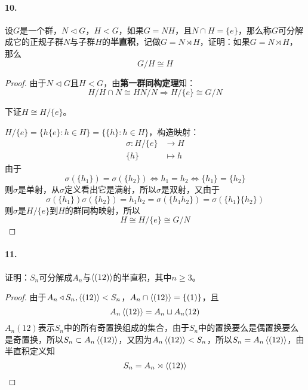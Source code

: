 \documentclass[12pt, a4paper, oneside]{ctexart}
\begin{document}
\paragraph{10.}设$G$是一个群，$N\triangleleft G$，$H < G$，如果$G=NH$，且$N\cap H=\{e\}$，那么称$G$可分解成它的正规子群$N$与子群$H$的\textbf{半直积}，记做$G=N\rtimes H$，证明：如果$G=N\rtimes H$，那么
\begin{equation*}
    G/H\cong H
\end{equation*}
\begin{proof}
    由于$N\triangleleft G$且$H < G$，由\textbf{第一群同构定理}知：
    \begin{equation*}
        H/H\cap N\cong HN/N\Rightarrow H/\{e\} \cong G/N
    \end{equation*}

    下证$H\cong H/\{e\}$。

    $H/\{e\}=\{h\{e\}:h\in H\}=\{\{h\}:h\in H\}$，构造映射：
    \begin{equation*}
        \begin{aligned}
            \sigma: H/\{e\}&\rightarrow H\\
            \{h\}&\mapsto h
        \end{aligned}
    \end{equation*}
    由于
    \begin{equation*}
        \sigma(\{h_1\}) = \sigma(\{h_2\})\iff h_1 = h_2\iff \{h_1\} = \{h_2\}
    \end{equation*}
    则$\sigma$是单射，从$\sigma$定义看出它是满射，所以$\sigma$是双射，又由于
    \begin{equation*}
        \sigma(\{h_1\})\sigma(\{h_2\}) = h_1h_2 = \sigma(\{h_1h_2\}) = \sigma(\{h_1\}\{h_2\})
    \end{equation*}
    则$\sigma$是$H/\{e\}$到$H$的群同构映射，所以
    \begin{equation*}
        H\cong H/\{e\}\cong G/N
    \end{equation*}
\end{proof}
\paragraph{11.}证明：$S_n$可分解成$A_n$与$\braket{(12)}$的半直积，其中$n\geqslant 3$。
\begin{proof}
    由于$A_n\triangleleft S_n, \braket{(12)} < S_n$，$A_n\cap \braket{(12)} = \{(1)\}$，且
    \begin{equation*}
        A_n\braket{(12)} = A_n\sqcup A_n(12)
    \end{equation*}
    $A_n(12)$表示$S_n$中的所有奇置换组成的集合，由于$S_n$中的置换要么是偶置换要么是奇置换，所以$S_n\subset A_n\braket{(12)}$，又因为$A_n\braket{(12)} < S_n$，所以$S_n = A_n\braket{(12)}$，由半直积定义知
    \begin{equation*}
        S_n = A_n\rtimes \braket{(12)}
    \end{equation*}
\end{proof}
\end{document}
